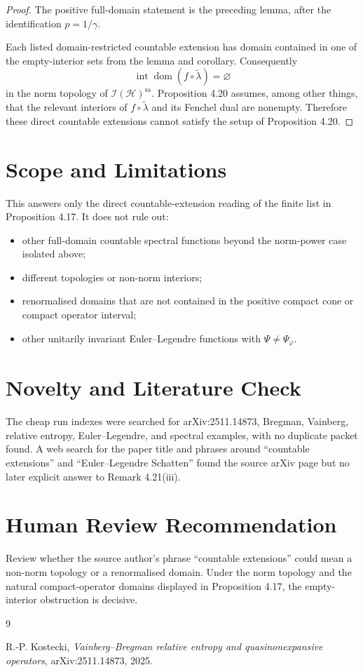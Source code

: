 \documentclass[11pt]{article}
\newcommand{\HH}{\mathcal H}
\newcommand{\I}{\mathcal I}
\newcommand{\sa}{\mathrm{sa}}
\newcommand{\dom}{\operatorname{dom}}
\newcommand{\Int}{\operatorname{int}}
\begin{document}
\begin{proof}
The positive full-domain statement is the preceding lemma, after the
identification $p=1/\gamma$.

Each listed domain-restricted countable extension has domain contained in
one of the empty-interior sets from the lemma and corollary. Consequently
\[
  \Int\dom(f\circ\widetilde\lambda)=\varnothing
\]
in the norm topology of $\I(\HH)^\sa$. Proposition 4.20 assumes, among
other things, that the relevant interiors of
$f\circ\widetilde\lambda$ and its Fenchel dual are nonempty. Therefore
these direct countable extensions cannot satisfy the setup of
Proposition 4.20.
\end{proof}

\section*{Scope and Limitations}

This answers only the direct countable-extension reading of the finite
list in Proposition 4.17. It does not rule out:
\begin{itemize}
\item other full-domain countable spectral functions beyond the norm-power
  case isolated above;
\item different topologies or non-norm interiors;
\item renormalised domains that are not contained in the positive compact
  cone or compact operator interval;
\item other unitarily invariant Euler--Legendre functions with
  $\Psi\ne\Psi_\varphi$.
\end{itemize}

\section*{Novelty and Literature Check}

The cheap run indexes were searched for arXiv:2511.14873, Bregman,
Vainberg, relative entropy, Euler--Legendre, and spectral examples, with
no duplicate packet found. A web search for the paper title and phrases
around ``countable extensions'' and ``Euler--Legendre Schatten'' found
the source arXiv page but no later explicit answer to Remark 4.21(iii).

\section*{Human Review Recommendation}

Review whether the source author's phrase ``countable extensions'' could
mean a non-norm topology or a renormalised domain. Under the norm topology
and the natural compact-operator domains displayed in Proposition 4.17,
the empty-interior obstruction is decisive.

\begin{thebibliography}{9}

R.-P. Kostecki,
\emph{Vainberg--Bregman relative entropy and quasinonexpansive operators},
arXiv:2511.14873, 2025.

\end{thebibliography}
\end{document}
